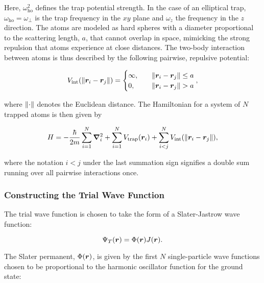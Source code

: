 Here, $\omega_\mathrm{ho}^2$ defines the trap potential strength. In the case of an elliptical trap, $\omega_\mathrm{ho}=\omega_\perp$ is the trap frequency in the $xy$ plane and $\omega_z$ the frequency in the $z$ direction. The atoms are modeled as hard spheres with a diameter proportional to the scattering length, $a$, that cannot overlap in space, mimicking the strong repulsion that atoms experience at close distances. The two-body interaction between atoms is thus described by the following pairwise, repulsive potential:

\begin{equation}\label{eq:Vint}
    V_\mathrm{int} \qty(\norm{\bm{r}_i - \bm{r}_j}) = 
    \begin{cases}
        \infty, \quad &\norm{\bm{r}_i - \bm{r}_j} \leq a
        \\
        0, \quad &\norm{\bm{r}_i - \bm{r}_j} > a
    \end{cases},
\end{equation}

where $\norm{\cdot}$ denotes the Euclidean distance. The Hamiltonian for a system of $N$ trapped atoms is then given by

\begin{equation}\label{eq:full_hamiltonian}
    H = - \frac{\hbar}{2m} \sum_{i=1}^{N} \grad^2_i + \sum_{i=1}^{N} V_\mathrm{trap}\qty(\bm{r}_i) + \sum_{i < j}^{N} V_\mathrm{int} \qty(\norm{\bm{r}_i - \bm{r}_j}),
\end{equation}

where the notation $i<j$ under the last summation sign signifies a double sum running over all pairwise interactions once. 

\subsubsection{Constructing the Trial Wave Function}

The trial wave function is chosen to take the form of a Slater-Jastrow wave function: 

\begin{equation}\label{eq:twf}
    \Psi_T (\bm{r}) = \Phi \qty(\bm{r}) J \qty(\bm{r}).
\end{equation}

The Slater permanent, $\Phi \qty(\bm{r})$, is given by the first $N$ single-particle wave functions chosen to be proportional to the harmonic oscillator function for the ground state: 

